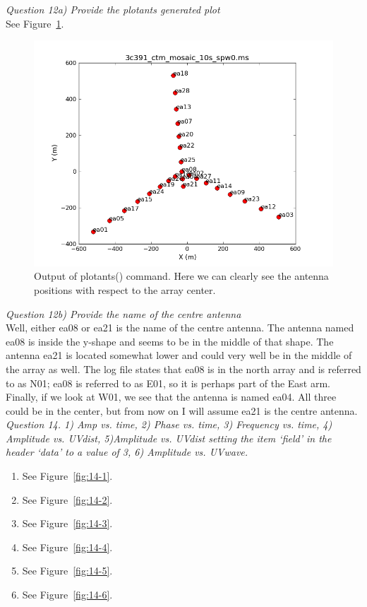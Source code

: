 \documentclass[12pt, a4paper]{article}
\begin{document}
\noindent \textit{Question 12a) Provide the plotants generated plot} \\
See Figure~\ref{fig:12b}. \\
\begin{figure}
    \centering
    \includegraphics[scale=0.7]{../Imaging/plots/plotants_vraag12.png}
    \caption{Output of plotants() command. Here we can clearly see the antenna positions with respect to the array center. \label{fig:12b}}
\end{figure}

\noindent \textit{Question 12b) Provide the name of the centre antenna} \\
Well, either ea08 or ea21 is the name of the centre antenna. The antenna named ea08 is inside the y-shape and seems to be in the middle of that shape. The antenna ea21 is located somewhat lower and could very well be in the middle of the array as well. The log file states that ea08 is in the north array and is referred to as N01; ea08 is referred to as E01, so it is perhaps part of the East arm. Finally, if we look at W01, we see that the antenna is named ea04. All three could be in the center, but from now on I will assume ea21 is the centre antenna. \\


\noindent \textit{Question 14. 1) Amp vs. time, 2) Phase vs. time, 3) Frequency vs. time, 4) Amplitude vs. UVdist, 5)Amplitude vs. UVdist setting the item `field' in the header `data' to a value of 3, 6) Amplitude vs. UVwave.}
\begin{enumerate}
    \item See Figure~\ref{fig:14-1}.
    \item See Figure~\ref{fig:14-2}.
    \item See Figure~\ref{fig:14-3}.
    \item See Figure~\ref{fig:14-4}.
    \item See Figure~\ref{fig:14-5}.
    \item See Figure~\ref{fig:14-6}.
\end{enumerate}
\end{document}
